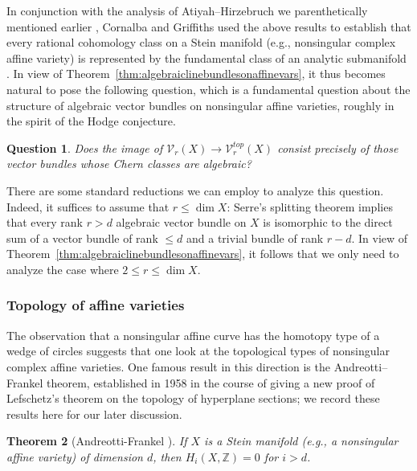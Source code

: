 \documentclass[11pt,leqno]{article}
\newcommand{\Z}{{\mathbb Z}}
\renewcommand{\1}{{\rm 1\hspace*{-0.4ex}%
\rule{0.1ex}{1.52ex}\hspace*{0.2ex}}}
\newcommand{\<}[1]{{\langle}#1 {\rangle}}
\theoremstyle{plain}
\newtheorem{theorem}{Theorem}[subsection]
\newtheorem{question}[theorem]{Question}
\theoremstyle{definition}
\theoremstyle{remark}
\numberwithin{equation}{subsection}
\begin{document}
In conjunction with the analysis of Atiyah--Hirzebruch we parenthetically mentioned earlier \cite{AtiyahHirzebruch1962Analytic}, Cornalba and Griffiths used the above results to establish that every rational cohomology class on a Stein manifold (e.g., nonsingular complex affine variety) is represented by the fundamental class of an analytic submanifold \cite[Theorem VIII p.91]{CornalbaGriffiths1975Analytic}.  In view of Theorem~\ref{thm:algebraiclinebundlesonaffinevars}, it thus becomes natural to pose the following question, which is a fundamental question about the structure of algebraic vector bundles on nonsingular affine varieties, roughly in the spirit of the Hodge conjecture. 

\begin{question}
	\label{question:griffiths}
	Does the image of $\mathscr{V}_r(X) \to \mathscr{V}_r^{top}(X)$ consist precisely of those vector bundles whose Chern classes are algebraic? 
\end{question}

There are some standard reductions we can employ to analyze this question.  Indeed, it suffices to assume that $r \leq \dim X$: Serre's splitting theorem \cite{SerreSplitting} implies that every rank $r > d$ algebraic vector bundle on $X$ is isomorphic to the direct sum of a vector bundle of rank $\leq d$ and a trivial bundle of rank $r-d$.  In view of Theorem~\ref{thm:algebraiclinebundlesonaffinevars}, it follows that we only need to analyze the case where $2 \leq r \leq \dim X$.  

\subsubsection*{Topology of affine varieties}
The observation that a nonsingular affine curve has the homotopy type of a wedge of circles suggests that one look at the topological types of nonsingular complex affine varieties.  One famous result in this direction is the Andreotti--Frankel theorem, established in 1958 in the course of giving a new proof of Lefschetz's theorem on the topology of hyperplane sections; we record these results here for our later discussion.  

\begin{theorem}[Andreotti-Frankel {\cite[Theorem 1]{AndreottiFrankel1959}}]
	If $X$ is a Stein manifold (e.g., a nonsingular affine variety) of dimension $d$, then $H_i(X,\Z) = 0$ for $i > d$.
\end{theorem}
\end{document}
